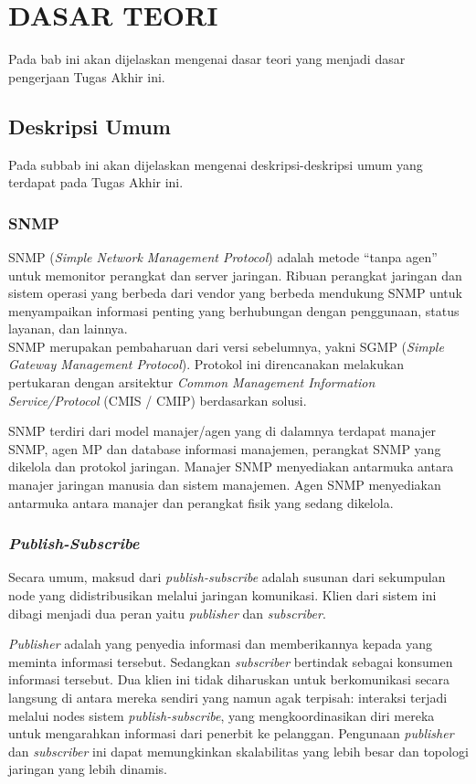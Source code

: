 \chapter{DASAR TEORI}
Pada bab ini akan dijelaskan mengenai dasar teori yang menjadi dasar pengerjaan Tugas Akhir ini.


\section{Deskripsi Umum}
Pada subbab ini akan dijelaskan mengenai deskripsi-deskripsi umum yang terdapat pada Tugas Akhir ini.

\subsection{SNMP}
SNMP (\textit{Simple Network Management Protocol}) adalah metode “tanpa agen” untuk memonitor perangkat dan server jaringan. Ribuan perangkat jaringan dan sistem operasi yang berbeda dari vendor yang berbeda mendukung SNMP untuk menyampaikan informasi penting yang berhubungan dengan penggunaan, status layanan, dan lainnya.\\
SNMP merupakan pembaharuan dari versi sebelumnya, yakni SGMP (\textit{Simple Gateway Management Protocol}). Protokol ini direncanakan melakukan pertukaran dengan arsitektur \textit{Common Management Information Service/Protocol} (CMIS / CMIP) berdasarkan solusi.

SNMP terdiri dari model manajer/agen yang di dalamnya terdapat manajer SNMP, agen MP dan database informasi manajemen, perangkat SNMP yang dikelola dan protokol jaringan. Manajer SNMP menyediakan antarmuka antara manajer jaringan manusia dan sistem manajemen. Agen SNMP menyediakan antarmuka antara manajer dan perangkat fisik yang sedang dikelola.


\subsection{\textit{Publish-Subscribe}}
Secara umum, maksud dari \textit{publish-subscribe} adalah susunan dari sekumpulan node yang didistribusikan melalui jaringan komunikasi. Klien dari sistem ini dibagi menjadi dua peran yaitu \textit{publisher} dan \textit{subscriber}.

\textit{Publisher} adalah yang penyedia informasi dan memberikannya kepada yang meminta informasi tersebut. Sedangkan \textit{subscriber} bertindak sebagai konsumen informasi tersebut. Dua klien ini tidak diharuskan untuk berkomunikasi secara langsung di antara mereka sendiri yang namun agak terpisah: interaksi terjadi melalui nodes sistem \textit{publish-subscribe}, yang mengkoordinasikan diri mereka untuk mengarahkan informasi dari penerbit ke pelanggan. Pengunaan \textit{publisher} dan \textit{subscriber} ini dapat memungkinkan skalabilitas yang lebih besar dan topologi jaringan yang lebih dinamis.

